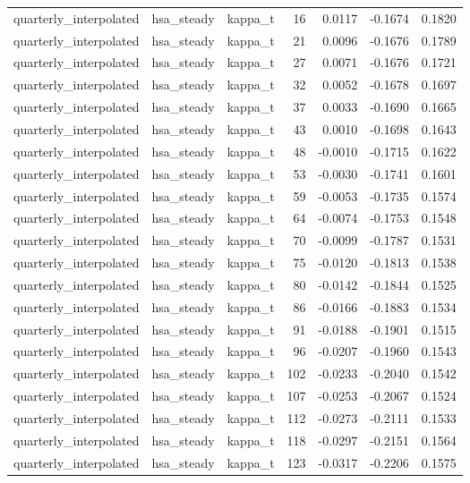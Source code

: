 \begin{tabular}{lllrrrr}
quarterly\_interpolated & hsa\_steady & kappa\_t & 16 & 0.0117 & -0.1674 & 0.1820 \\
quarterly\_interpolated & hsa\_steady & kappa\_t & 21 & 0.0096 & -0.1676 & 0.1789 \\
quarterly\_interpolated & hsa\_steady & kappa\_t & 27 & 0.0071 & -0.1676 & 0.1721 \\
quarterly\_interpolated & hsa\_steady & kappa\_t & 32 & 0.0052 & -0.1678 & 0.1697 \\
quarterly\_interpolated & hsa\_steady & kappa\_t & 37 & 0.0033 & -0.1690 & 0.1665 \\
quarterly\_interpolated & hsa\_steady & kappa\_t & 43 & 0.0010 & -0.1698 & 0.1643 \\
quarterly\_interpolated & hsa\_steady & kappa\_t & 48 & -0.0010 & -0.1715 & 0.1622 \\
quarterly\_interpolated & hsa\_steady & kappa\_t & 53 & -0.0030 & -0.1741 & 0.1601 \\
quarterly\_interpolated & hsa\_steady & kappa\_t & 59 & -0.0053 & -0.1735 & 0.1574 \\
quarterly\_interpolated & hsa\_steady & kappa\_t & 64 & -0.0074 & -0.1753 & 0.1548 \\
quarterly\_interpolated & hsa\_steady & kappa\_t & 70 & -0.0099 & -0.1787 & 0.1531 \\
quarterly\_interpolated & hsa\_steady & kappa\_t & 75 & -0.0120 & -0.1813 & 0.1538 \\
quarterly\_interpolated & hsa\_steady & kappa\_t & 80 & -0.0142 & -0.1844 & 0.1525 \\
quarterly\_interpolated & hsa\_steady & kappa\_t & 86 & -0.0166 & -0.1883 & 0.1534 \\
quarterly\_interpolated & hsa\_steady & kappa\_t & 91 & -0.0188 & -0.1901 & 0.1515 \\
quarterly\_interpolated & hsa\_steady & kappa\_t & 96 & -0.0207 & -0.1960 & 0.1543 \\
quarterly\_interpolated & hsa\_steady & kappa\_t & 102 & -0.0233 & -0.2040 & 0.1542 \\
quarterly\_interpolated & hsa\_steady & kappa\_t & 107 & -0.0253 & -0.2067 & 0.1524 \\
quarterly\_interpolated & hsa\_steady & kappa\_t & 112 & -0.0273 & -0.2111 & 0.1533 \\
quarterly\_interpolated & hsa\_steady & kappa\_t & 118 & -0.0297 & -0.2151 & 0.1564 \\
quarterly\_interpolated & hsa\_steady & kappa\_t & 123 & -0.0317 & -0.2206 & 0.1575 \\

\end{tabular}
